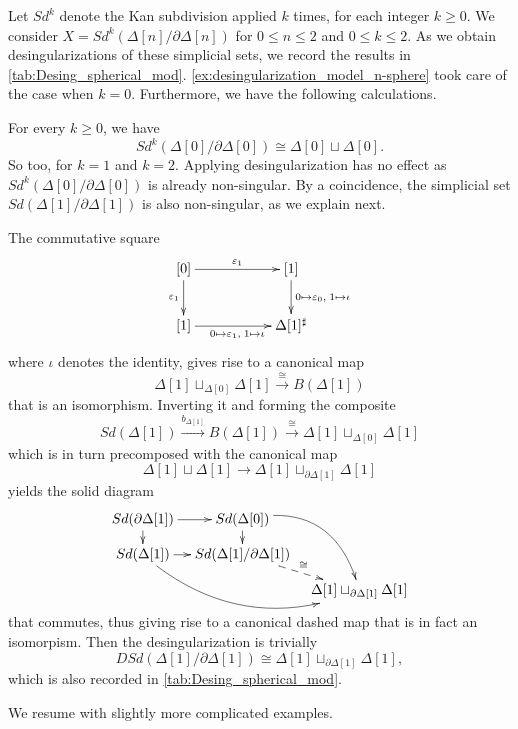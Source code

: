 Let $Sd^k$ denote the Kan subdivision applied $k$ times, for each integer $k\geq 0$. We consider $X=Sd^k(\Delta [n]/\partial \Delta [n])$ for $0\leq n\leq 2$ and $0\leq k\leq 2$. As we obtain desingularizations of these simplicial sets, we record the results in \cref{tab:Desing_spherical_mod}. \cref{ex:desingularization_model_n-sphere} took care of the case when $k=0$. Furthermore, we have the following calculations.
\begin{example}\label{ex:all_subdivisions_sphere_dim_zero_coincidence_dim_one}
For every $k\geq 0$, we have
\[Sd^k(\Delta [0]/\partial \Delta [0])\cong \Delta [0]\sqcup \Delta [0].\]
So too, for $k=1$ and $k=2$. Applying desingularization has no effect as $Sd^k(\Delta [0]/\partial \Delta [0])$ is already non-singular. By a coincidence, the simplicial set $Sd(\Delta [1]/\partial \Delta [1])$ is also non-singular, as we explain next.

The commutative square
\begin{displaymath}
\xymatrix{
[0] \ar[d]_{\varepsilon _1} \ar[rr]^{\varepsilon _1} && [1] \ar[d]^{0\mapsto \varepsilon _0,\; 1\mapsto \iota } \\
[1] \ar[rr]_{0\mapsto \varepsilon _1,\; 1\mapsto \iota } && \Delta [1]^\sharp
}
\end{displaymath}
where $\iota$ denotes the identity, gives rise to a canonical map
\[\Delta [1]\sqcup _{\Delta [0]}\Delta [1]\xrightarrow{\cong } B(\Delta [1])\]
that is an isomorphism. Inverting it and forming the composite
\[Sd(\Delta [1])\xrightarrow{b_{\Delta [1]}} B(\Delta [1])\xrightarrow{\cong } \Delta [1]\sqcup _{\Delta [0]}\Delta [1]\]
which is in turn precomposed with the canonical map
\[\Delta [1]\sqcup \Delta [1]\to \Delta [1]\sqcup _{\partial \Delta [1]}\Delta [1]\]
yields the solid diagram
\begin{displaymath}
\xymatrix@=0.9em{
Sd(\partial \Delta [1]) \ar[d] \ar[r] & Sd(\Delta [0]) \ar[d] \ar@/^2pc/[ddr] \\
Sd(\Delta [1]) \ar@/_2pc/[drr] \ar[r] & Sd(\Delta [1]/\partial \Delta [1]) \ar@{-->}[dr]^\cong \\
&& \Delta [1]\sqcup _{\partial \Delta [1]}\Delta [1]
}
\end{displaymath}
that commutes, thus giving rise to a canonical dashed map that is in fact an isomorpism. Then the desingularization is trivially
\[DSd(\Delta [1]/\partial \Delta [1])\cong \Delta [1]\sqcup _{\partial \Delta [1]}\Delta [1],\]
which is also recorded in \cref{tab:Desing_spherical_mod}.
\end{example}
\noindent We resume with slightly more complicated examples.

